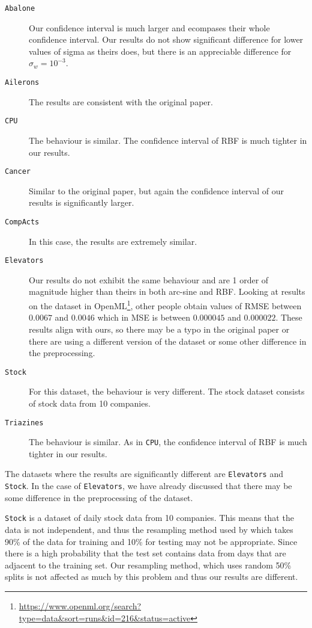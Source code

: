 \begin{description}
    \item[\texttt{Abalone}] Our confidence interval is much larger and ecompases
        their whole confidence interval. Our results do not show significant difference
        for lower values of sigma as theirs does, but there is an appreciable
        difference for $\sigma_w=10^{-3}$.
    \item[\texttt{Ailerons}] The results are consistent with the original paper.
    \item[\texttt{CPU}] The behaviour is similar. The confidence interval of RBF
        is much tighter in our results.
    \item[\texttt{Cancer}] Similar to the original paper, but again the confidence
        interval of our results is significantly larger.
    \item[\texttt{CompActs}] In this case, the results are extremely similar.
    \item[\texttt{Elevators}] Our results do not exhibit the same behaviour and
        are 1 order of magnitude higher than theirs in both arc-sine and RBF. Looking
        at results on the dataset in OpenML\footnote{\url{https://www.openml.org/search?type=data&sort=runs&id=216&status=active}}, other people obtain values of RMSE between $0.0067$ and $0.0046$ which
        in MSE is between $0.000045$ and $0.000022$. These results align with ours,
        so there may be a typo in the original paper or there are using a different
        version of the dataset or some other difference in the preprocessing.
    \item[\texttt{Stock}] For this dataset, the behaviour is very different. The
        stock dataset consists of stock data from 10 companies.
    \item[\texttt{Triazines}] The behaviour is similar. As in \texttt{CPU},
        the confidence interval of RBF is much tighter in our results.
\end{description}

The datasets where the results are significantly different are \texttt{Elevators}
and \texttt{Stock}. In the case of \texttt{Elevators}, we have already discussed
that there may be some difference in the preprocessing of the dataset.

\texttt{Stock} is a dataset of daily stock data from 10 companies. This
means that the data is not independent, and thus the resampling method used
by \textcite{frenayParameterinsensitiveKernelExtreme2011} which takes
90\% of the data for training and 10\% for testing may not be appropriate. Since
there is a high probability that the test set contains data from days that are
adjacent to the training set. Our resampling method, which uses random
50\% splits is not affected as much by this problem and thus our results are
different.
